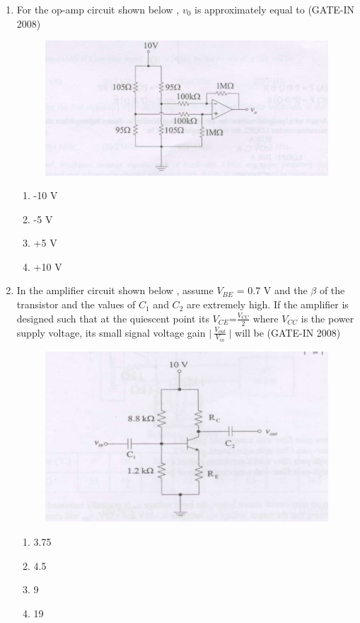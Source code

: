 \documentclass[journal,12pt,onecolumn]{IEEEtran}
\theoremstyle{remark}
\begin{document}
\begin{enumerate}
    \item  For the op-amp circuit shown below , $v_0$ is approximately equal to \hfill{(GATE-IN 2008)}
    \begin{figure}[H]
    \centering
    \includegraphics[width=0.5\columnwidth]{figs/i21.jpg}
    \caption{}
    \label{fig:placeholder21}
\end{figure}
\begin{multicols}{4}
    \begin{enumerate} 
        \item -10 V
        \item  -5 V
        \item  +5 V
        \item +10 V
    \end{enumerate}
    \end{multicols}
    
    \item  In the amplifier circuit shown below , assume $V_{BE}$ = 0.7 V and the $\beta$ of the transistor and the values
of $C_1$ and $C_2$ are extremely high. If the amplifier is designed such that at the quiescent point its $V_{CE}$=$\frac{V_{CC}}{2}$ where $V_{CC}$  is the power supply voltage, its small signal voltage gain $\lvert \ \frac{V_{out}}{V_{in}}\  \rvert$ will be \hfill{(GATE-IN 2008)}
\begin{figure}[H]
    \centering
    \includegraphics[width=0.5\columnwidth]{figs/i22.jpg}
    \caption{}
    \label{fig:placeholder22}
\end{figure}
\begin{multicols}{4}
    \begin{enumerate} 
        \item 3.75
        \item  4.5
        \item  9
        \item 19
    \end{enumerate}
    \end{multicols}
    

\end{enumerate}
\end{document}
